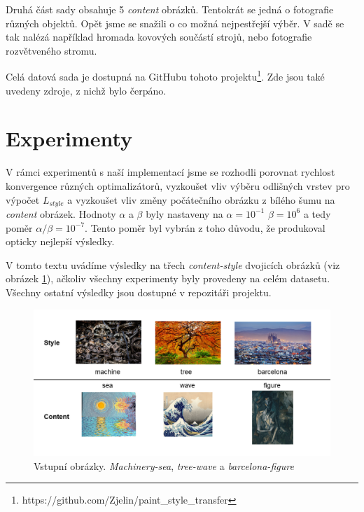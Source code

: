 \documentclass[twocolumn]{article}
\begin{document}
	Druhá část sady obsahuje 5 \textit{content} obrázků. Tentokrát se jedná o fotografie různých objektů. Opět jsme se snažili o co možná nejpestřejší výběr. V sadě se tak nalézá například hromada kovových součástí strojů, nebo fotografie rozvětveného stromu.
	\par
	Celá datová sada je dostupná na GitHubu tohoto projektu\footnote{https://github.com/Zjelin/paint\_style\_transfer}. Zde jsou také uvedeny zdroje, z nichž bylo čerpáno. 

	\section*{Experimenty}
	V rámci experimentů s naší implementací jsme se rozhodli porovnat rychlost konvergence různých optimalizátorů, vyzkoušet vliv výběru odlišných vrstev pro výpočet $L_{style}$ a vyzkoušet vliv změny počátečního obrázku z bílého šumu na \textit{content} obrázek. Hodnoty $\alpha$ a $\beta$ byly nastaveny na $\alpha = 10^{-1}$ $\beta = 10^6$ a tedy poměr $\alpha / \beta = 10^{-7} $. Tento poměr byl vybrán z toho důvodu, že produkoval opticky nejlepší výsledky.
	\par 
	V tomto textu uvádíme výsledky na třech \textit{content-style} dvojicích obrázků (viz obrázek \ref{UsedFigs}), ačkoliv všechny experimenty byly provedeny na celém datasetu. Všechny ostatní výsledky jsou dostupné v repozitáři projektu.

	\begin{figure}[h]
		\includegraphics[width=\linewidth]{figs.png}
		\caption{Vstupní obrázky. \textit{Machinery-sea}, \textit{tree-wave} a \textit{barcelona-figure}}
		\label{UsedFigs}
	\end{figure}
	
	
\end{document}
